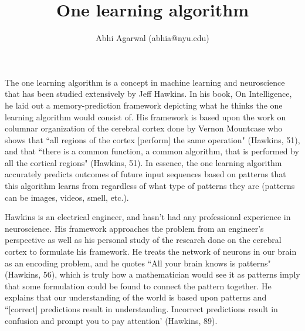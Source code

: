 \documentclass[11pt, oneside]{article}
\title{One learning algorithm}
\author{Abhi Agarwal (abhia@nyu.edu)}
\date{}
\begin{document}
\maketitle

\par The one learning algorithm is a concept in machine learning and neuroscience that has been studied extensively by Jeff Hawkins. In his book, On Intelligence, he laid out a memory-prediction framework depicting what he thinks the one learning algorithm would consist of. His framework is based upon the work on columnar organization of the cerebral cortex done by Vernon Mountcase who shows that ``all regions of the cortex [perform] the same operation" (Hawkins, 51), and that ``there is a common function, a common algorithm, that is performed by all the cortical regions" (Hawkins, 51). In essence, the one learning algorithm accurately predicts outcomes of future input sequences based on patterns that this algorithm learns from regardless of what type of patterns they are (patterns can be images, videos, smell, etc.).

\par Hawkins is an electrical engineer, and hasn't had any professional experience in neuroscience. His framework approaches the problem from an engineer's perspective as well as his personal study of the research done on the cerebral cortex to formulate his framework. He treats the network of neurons in our brain as an encoding problem, and he quotes ``All your brain knows is patterns" (Hawkins, 56), which is truly how a mathematician would see it as patterns imply that some formulation could be found to connect the pattern together. He explains that our understanding of the world is based upon patterns and ``[correct] predictions result in understanding. Incorrect predictions result in confusion and prompt you to pay attention' (Hawkins, 89). 
\end{document}
